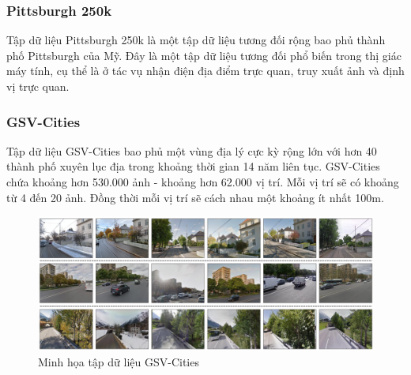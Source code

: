 \subsubsection*{Pittsburgh 250k \cite{6618963}}
Tập dữ liệu Pittsburgh 250k \cite{6618963} là một tập dữ liệu tương đối rộng bao phủ thành phố Pittsburgh của Mỹ. Đây là một tập dữ liệu tương đối phổ biến trong thị giác máy tính, cụ thể là ở tác vụ nhận điện địa điểm trực quan, truy xuất ảnh và định vị trực quan.

\subsubsection*{GSV-Cities \cite{Ali_bey_2022}}
Tập dữ liệu GSV-Cities \cite{Ali_bey_2022} bao phủ một vùng địa lý cực kỳ rộng lớn với hơn 40 thành phố xuyên lục địa trong khoảng thời gian 14 năm liên tục. GSV-Cities chứa khoảng hơn 530.000 ảnh - khoảng hơn 62.000 vị trí. Mỗi vị trí sẽ có khoảng từ 4 đến 20 ảnh. Đồng thời mỗi vị trí sẽ cách nhau một khoảng ít nhất 100m.
\begin{figure}[H]
	\centering
	\includegraphics[width=\textwidth]{pics/Chapter2/gsv.png}
	\caption{Minh họa tập dữ liệu GSV-Cities \cite{Ali_bey_2022}}
\end{figure}


